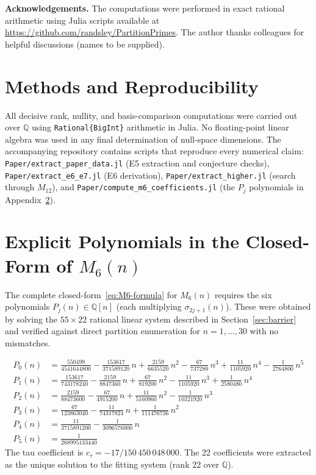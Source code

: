 \documentclass[11pt]{article}
\newcommand{\Q}{\mathbb{Q}}
\begin{document}
\medskip
\noindent\textbf{Acknowledgements.}
The computations were performed in exact rational arithmetic using Julia scripts
available at \url{https://github.com/randsley/PartitionPrimes}.
The author thanks colleagues for helpful discussions (names to be supplied).

\section{Methods and Reproducibility}
\label{sec:methods}

All decisive rank, nullity, and basis-comparison computations were carried out over $\Q$
using \texttt{Rational\{BigInt\}} arithmetic in Julia.
No floating-point linear algebra was used in any final determination of null-space
dimensions.
The accompanying repository contains scripts that reproduce every numerical claim:
\texttt{Paper/extract\_paper\_data.jl} (E5 extraction and conjecture checks),
\texttt{Paper/extract\_e6\_e7.jl} (E6 derivation),
\texttt{Paper/extract\_higher.jl} (search through $M_{12}$), and
\texttt{Paper/compute\_m6\_coefficients.jl} (the $P_j$ polynomials in
Appendix~\ref{app:M6-formula}).

\appendix

\section{Explicit Polynomials in the Closed-Form of $M_6(n)$}
\label{app:M6-formula}

The complete closed-form~\eqref{eq:M6-formula} for $M_6(n)$ requires the six polynomials
$P_j(n)\in\Q[n]$ (each multiplying $\sigma_{2j+1}(n)$).
These were obtained by solving the $55\times 22$ rational linear system described in
Section~\ref{sec:barrier} and verified against direct partition enumeration for $n=1,\ldots,30$
with no mismatches.

\begin{align*}
P_0(n)&=\frac{550499}{4541644800}-\frac{153617}{371589120}\,n+\frac{2159}{6635520}\,n^2-\frac{67}{737280}\,n^3+\frac{11}{1105920}\,n^4-\frac{1}{2764800}\,n^5\\[4pt]
P_1(n)&=\frac{153617}{743178240}-\frac{2159}{8847360}\,n+\frac{67}{819200}\,n^2-\frac{11}{1105920}\,n^3+\frac{1}{2580480}\,n^4\\[4pt]
P_2(n)&=\frac{2159}{88473600}-\frac{67}{4915200}\,n+\frac{11}{5160960}\,n^2-\frac{1}{10321920}\,n^3\\[4pt]
P_3(n)&=\frac{67}{123863040}-\frac{11}{74317824}\,n+\frac{1}{111476736}\,n^2\\[4pt]
P_4(n)&=\frac{11}{3715891200}-\frac{1}{3096576000}\,n\\[4pt]
P_5(n)&=\frac{1}{268995133440}
\end{align*}
The tau coefficient is $c_\tau=-17/150\,450\,048\,000$.
The 22 coefficients were extracted as the unique solution to the fitting system (rank 22 over
$\Q$).
\end{document}
